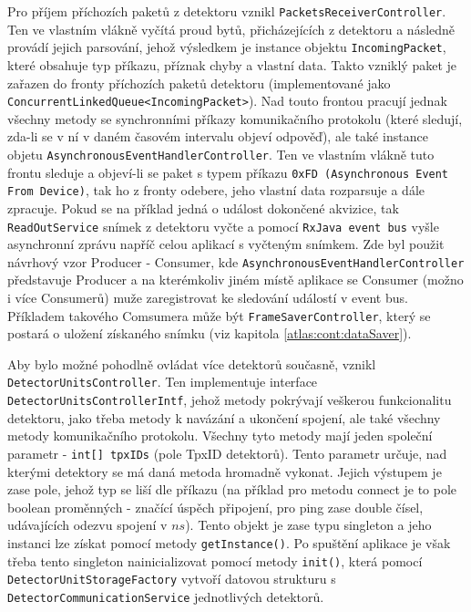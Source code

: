Pro příjem příchozích paketů z detektoru vznikl \texttt{PacketsReceiverController}. Ten ve vlastním vlákně vyčítá proud bytů, přicházejících z detektoru a následně provádí jejich parsování, jehož výsledkem je instance objektu \texttt{IncomingPacket}, které obsahuje typ příkazu, příznak chyby a vlastní data. Takto vzniklý paket je zařazen do fronty příchozích paketů detektoru (implementované jako \texttt{ConcurrentLinkedQueue<IncomingPacket>}). Nad touto frontou pracují jednak všechny metody se synchronními příkazy komunikačního protokolu (které sledují, zda-li se v ní v daném časovém intervalu objeví odpověď), ale také instance objetu \texttt{AsynchronousEventHandlerController}. Ten ve vlastním vlákně tuto frontu sleduje a objeví-li se paket s typem příkazu \texttt{0xFD (Asynchronous Event From Device)}, tak ho z fronty odebere, jeho vlastní data rozparsuje a dále zpracuje. Pokud se na příklad jedná o událost dokončené akvizice, tak \texttt{ReadOutService} snímek z detektoru vyčte a pomocí \texttt{RxJava event bus} vyšle asynchronní zprávu napříč celou aplikací s vyčteným snímkem. Zde byl použit návrhový vzor Producer - Consumer, kde \texttt{AsynchronousEventHandlerController} představuje Producer a na kterémkoliv jiném místě aplikace se Consumer (možno i více Consumerů) muže zaregistrovat ke sledování událostí v event bus. Příkladem takového Comsumera může být \texttt{FrameSaverController}, který se postará o uložení získaného snímku (viz kapitola \ref{atlas:cont:dataSaver}).

Aby bylo možné pohodlně ovládat více detektorů současně, vznikl\\\texttt{DetectorUnitsController}. Ten implementuje interface \texttt{DetectorUnitsControllerIntf}, jehož metody pokrývají veškerou funkcionalitu detektoru, jako třeba metody k navázání a ukončení spojení, ale také všechny metody komunikačního protokolu. Všechny tyto metody mají jeden společní parametr - \texttt{int[] tpxIDs} (pole TpxID detektorů). Tento parametr určuje, nad kterými detektory se má daná metoda hromadně vykonat. Jejich výstupem je zase pole, jehož typ se liší dle příkazu (na příklad pro metodu connect je to pole boolean proměnných - značící úspěch připojení, pro ping zase double čísel, udávajících odezvu spojení v $ns$). Tento objekt je zase typu singleton a jeho instanci lze získat pomocí metody \texttt{getInstance()}. Po spuštění aplikace je však třeba tento singleton nainicializovat pomocí metody \texttt{init()}, která pomocí \texttt{DetectorUnitStorageFactory} vytvoří datovou strukturu  s \texttt{DetectorCommunicationService} jednotlivých detektorů.


